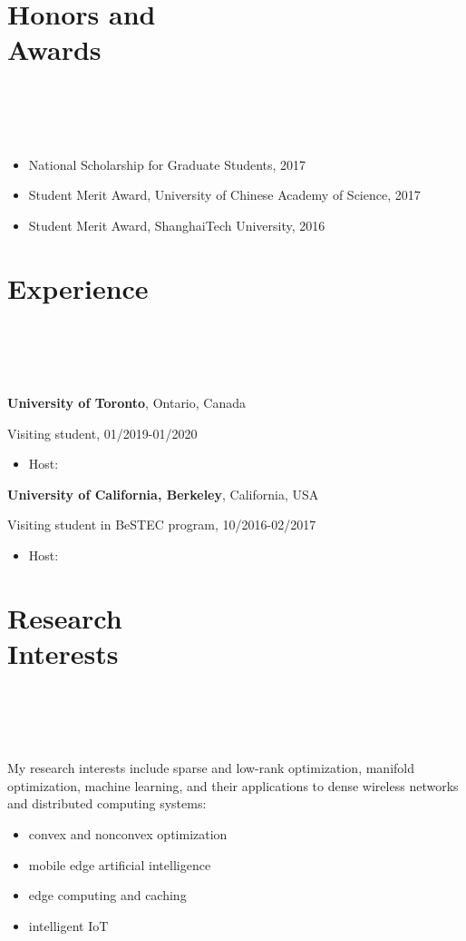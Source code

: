 \documentclass{article}
\newcommand{\homepage}[3][homepagecolor]{\href{#2}{\color{#1}{#3}}}
\begin{document}
\section*{\colorbox{mygrey}{Honors and Awards~~~~~~~~~~~~~~~~~~~~~~~~~~~~~~~~~~~~~~~~~~~~~~~~~~~~~~~~~~~~~~~~~~~~~~~~~~~~~~}}
\begin{itemize}
\item National Scholarship for Graduate Students, 2017
\item Student Merit Award, University of Chinese Academy of Science, 2017
\item Student Merit Award, ShanghaiTech University, 2016
\end{itemize}

\section*{\colorbox{mygrey}{Experience~~~~~~~~~~~~~~~~~~~~~~~~~~~~~~~~~~~~~~~~~~~~~~~~~~~~~~~~~~~~~~~~~~~~~~~~~~~~~}}
{\bf{University of Toronto}}, Ontario, Canada

Visiting student, 01/2019-01/2020
\begin{itemize}
\item Host: \homepage{https://www.comm.utoronto.ca/~weiyu/}{Prof. Wei Yu}
\end{itemize}


{\bf{University of California, Berkeley}}, California, USA

Visiting student in BeSTEC program, 10/2016-02/2017
\begin{itemize}
\item Host: \homepage{https://people.eecs.berkeley.edu/~wainwrig/}{Prof. Martin J. Wainwright}
\end{itemize}


\section*{\colorbox{mygrey}{Research Interests~~~~~~~~~~~~~~~~~~~~~~~~~~~~~~~~~~~~~~~~~~~~~~~~~~~~~~~~~~~~~~~~~~~~~~~~~~~~~~~}}
My research interests include sparse and low-rank optimization, manifold optimization, machine learning, and their applications to dense wireless networks and distributed computing systems:
\begin{itemize}
   \item convex and nonconvex optimization
   \item mobile edge artificial intelligence
   \item edge computing and caching
   \item intelligent IoT
 \end{itemize} 
\end{document}
